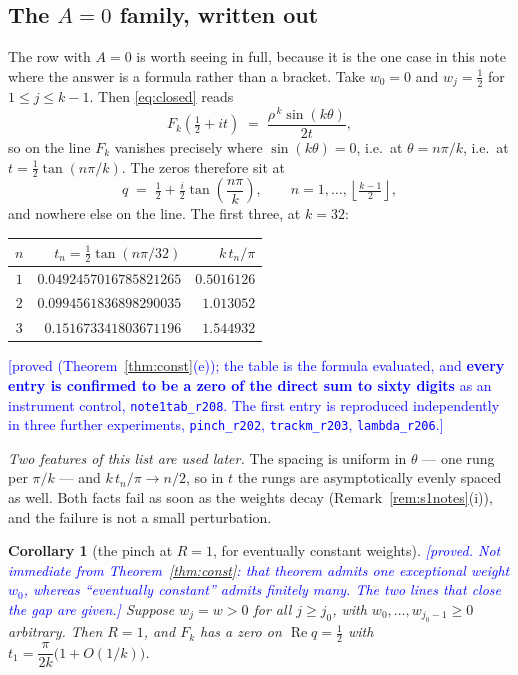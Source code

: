 \documentclass[11pt,a4paper]{article}
\theoremstyle{plain}
\newtheorem{corollary}[theorem]{Corollary}
\theoremstyle{definition}
\theoremstyle{remark}
\newcommand{\STATUS}[1]{\textcolor{blue}{\textsf{[#1]}}}
\begin{document}
\subsection{The $A=0$ family, written out}\label{sec:worked}

The row with $A=0$ is worth seeing in full, because it is the one case in this note where
the answer is a formula rather than a bracket. Take $w_0=0$ and $w_j=\tfrac12$ for
$1\le j\le k-1$. Then \eqref{eq:closed} reads
\[
  F_k\!\left(\tfrac12+it\right)\;=\;\frac{\rho^{\,k}\sin(k\theta)}{2t},
\]
so on the line $F_k$ vanishes precisely where $\sin(k\theta)=0$, i.e.\ at
$\theta=n\pi/k$, i.e.\ at $t=\tfrac12\tan(n\pi/k)$. The zeros therefore sit at
\[
  q\;=\;\tfrac12+\tfrac{i}{2}\tan\!\left(\frac{n\pi}{k}\right),
  \qquad n=1,\dots,\left\lfloor\tfrac{k-1}{2}\right\rfloor,
\]
and nowhere else on the line. The first three, at $k=32$:

\begin{center}
\begin{tabular}{crr}
\toprule
$n$ & $t_n=\tfrac12\tan(n\pi/32)$ & $k\,t_n/\pi$\\
\midrule
$1$ & $0.0492457016785821265$ & $0.5016126$\\
$2$ & $0.0994561836898290035$ & $1.013052$\\
$3$ & $0.151673341803671196$  & $1.544932$\\
\bottomrule
\end{tabular}
\end{center}

\STATUS{proved (Theorem~\ref{thm:const}(e)); the table is the formula evaluated, and
\textbf{every entry is confirmed to be a zero of the direct sum to sixty digits} as an
instrument control, \texttt{note1tab\_r208}. The first entry is reproduced independently
in three further experiments, \texttt{pinch\_r202}, \texttt{trackm\_r203},
\texttt{lambda\_r206}.}

\emph{Two features of this list are used later.} The spacing is uniform in $\theta$ ---
one rung per $\pi/k$ --- and $k\,t_n/\pi\to n/2$, so in $t$ the rungs are asymptotically
evenly spaced as well. Both facts fail as soon as the weights decay
(Remark~\ref{rem:s1notes}(i)), and the failure is not a small perturbation.

\begin{corollary}[the pinch at $R=1$, for eventually constant weights]\label{cor:pinch}
\STATUS{proved. \emph{Not} immediate from Theorem~\ref{thm:const}: that theorem admits
one exceptional weight $w_0$, whereas ``eventually constant'' admits finitely many. The
two lines that close the gap are given.}
Suppose $w_j=w>0$ for all $j\ge j_0$, with $w_0,\dots,w_{j_0-1}\ge0$ arbitrary. Then
$R=1$, and $F_k$ has a zero on $\operatorname{Re}q=\tfrac12$ with
$t_1=\dfrac{\pi}{2k}\bigl(1+O(1/k)\bigr)$.
\end{corollary}
\end{document}
